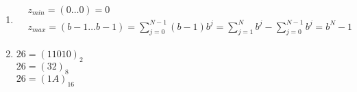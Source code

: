 \begin{enumerate}
	\item \begin{align*}
	&z_{min} = (0\dots0) = 0 \\
	&z_{max} = (b-1\dots b-1) = 
	\sum_{j=0}^{N-1}(b-1)b^j =
		\sum_{j=1}^{N} b^j - \sum_{j=0}^{N-1} b^j  =  b^N - 1 
	\end{align*}
	
	\item $26 = (11010)_2$ \\
	 $26 = (32)_8$\\
	 $26 = (1A)_{16}$
\end{enumerate}